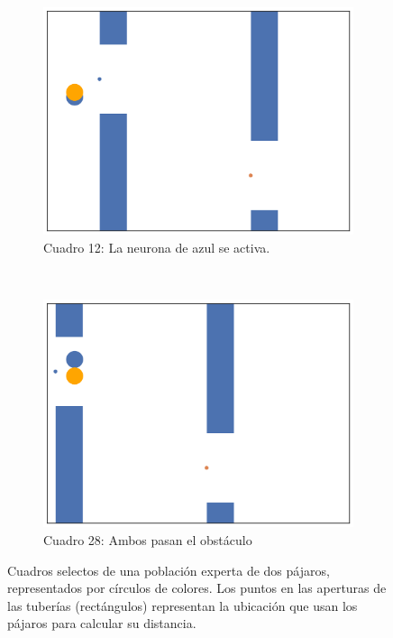 \documentclass[twocolumn,spanish]{revtex4-1}
\begin{document}
\begin{figure}[t]
\begin{subfigure}[t]{0.25\linewidth}
        \includegraphics[width=\linewidth]{00035.png}
        \caption{Cuadro 12: La neurona de azul se activa.}
    \end{subfigure}%
    ~\hfill
    \begin{subfigure}[t]{0.25\linewidth}
        \centering
        \includegraphics[width=\linewidth]{00051.png}
        \caption{Cuadro 28: Ambos pasan el obstáculo}
    \end{subfigure}%
    \caption{Cuadros selectos de una población experta de dos pájaros, representados por círculos de colores. Los puntos en las aperturas de las tuberías (rectángulos) representan la ubicación que usan los pájaros para calcular su distancia.}
    \label{fig:evol}
\end{figure}
\end{document}
